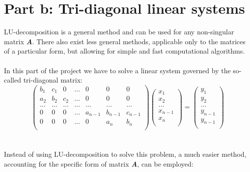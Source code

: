 \documentclass[]{article}
\begin{document}
  \section{Part b: Tri-diagonal linear systems}
  LU-decomposition is a general method and can be used for any non-singular matrix {\bf \it A}. 
  There also exist less general methods, applicable only to the matrices of a particular form, but
  allowing for simple and fast computational algorithms.\\
  \\
  In this part of the project we have to solve a linear system governed by the so-called tri-diagonal
  matrix:
  \\
  \begin{equation}
    \left(\begin{array}{ccccccc}
      b_1   & c_1  & 0    &\dots   &0       &0       &0       \\
      a_2   & b_2  & c_2  &\dots   &0       &0       &0       \\
      \dots &\dots &\dots &\dots   &\dots   &\dots   &\dots   \\
      0     &0     &0     &\dots   &a_{n-1} &b_{n-1} &c_{n-1} \\
      0     &0     &0     &\dots   &0       &a_n     &b_n     \\
    \end{array}
    \right)\left(\begin{array}{c}
      x_1     \\
      x_2     \\
      \dots   \\
      x_{n-1} \\
      x_n     \\
    \end{array} \right)
    =
    \left(\begin{array}{c}
      y_1     \\
      y_2     \\
      \dots   \\
      y_{n-1} \\
      y_{n-1} \\
    \end{array} \right) \nonumber
  \end{equation}\\
  \\
  Instead of using LU-decomposition to solve this problem, a much easier method, accounting
  for the specific form of matrix {\bf \it A}, can be employed:
  \\
\end{document}
